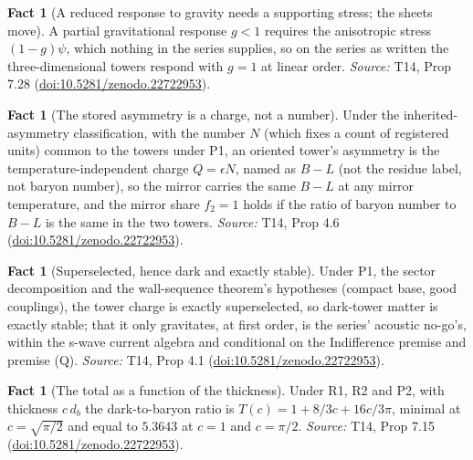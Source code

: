 \documentclass[11pt]{article}
\theoremstyle{definition}
\newtheorem{fact}[theorem]{Fact}
\theoremstyle{plain}
\newcommand{\changedmark}[2]{\marginpar{\raggedright\scriptsize\color{#1}#2}}
\begin{document}
\begin{fact}[A reduced response to gravity needs a supporting stress; the sheets move]\label{c:dark-matter.reduced-response-gravity-needs-supporting-stress}
A partial gravitational response $g < 1$ requires the anisotropic stress $(1 - g)\psi$, which nothing in the series supplies, so on the series as written the three-dimensional towers respond with $g = 1$ at linear order.
\emph{Source:} T14, Prop 7.28 (\href{https://doi.org/10.5281/zenodo.22722953}{doi:10.5281/zenodo.22722953}).
\end{fact}

\begin{fact}[The stored asymmetry is a charge, not a number]\label{c:dark-matter.stored-asymmetry-charge-not-number}
Under the inherited-asymmetry classification, with the number $N$ (which fixes a count of registered units) common to the towers under P1, an oriented tower's asymmetry is the temperature-independent charge $Q = \epsilon N$, named as $B - L$ (not the residue label, not baryon number), so the mirror carries the same $B - L$ at any mirror temperature, and the mirror share $f_{2} = 1$ holds if the ratio of baryon number to $B - L$ is the same in the two towers.
\emph{Source:} T14, Prop 4.6 (\href{https://doi.org/10.5281/zenodo.22722953}{doi:10.5281/zenodo.22722953}).
\end{fact}

\begin{fact}[Superselected, hence dark and exactly stable]\label{c:dark-matter.superselected-hence-dark-exactly-stable}
\changedmark{BrickRed}{corrected since the deposit}
Under P1, the sector decomposition and the wall-sequence theorem's hypotheses (compact base, good couplings), the tower charge is exactly superselected, so dark-tower matter is exactly stable; that it only gravitates, at first order, is the series' acoustic no-go's, within the s-wave current algebra and conditional on the Indifference premise and premise (Q).
\emph{Source:} T14, Prop 4.1 (\href{https://doi.org/10.5281/zenodo.22722953}{doi:10.5281/zenodo.22722953}).
\end{fact}

\begin{fact}[The total as a function of the thickness]\label{c:dark-matter.total-function-thickness}
Under R1, R2 and P2, with thickness $c\,d_{b}$ the dark-to-baryon ratio is $T(c) = 1 + 8/3c + 16c/3\pi$, minimal at $c = \sqrt{\pi/2}$ and equal to $5.3643$ at $c = 1$ and $c = \pi/2$.
\emph{Source:} T14, Prop 7.15 (\href{https://doi.org/10.5281/zenodo.22722953}{doi:10.5281/zenodo.22722953}).
\end{fact}
\end{document}
